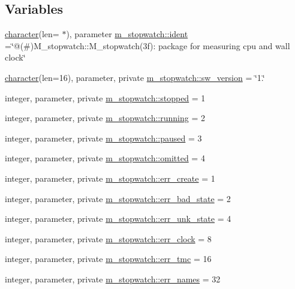 \subsection*{Variables}
\begin{DoxyCompactItemize}
\item 
\hyperlink{option__stopwatch_83_8txt_abd4b21fbbd175834027b5224bfe97e66}{character}(len= $\ast$), parameter \hyperlink{namespacem__stopwatch_a8c8ff2f2cb941e044ea889e7c728c8eb}{m\+\_\+stopwatch\+::ident} =\char`\"{}@(\#)M\+\_\+stopwatch\+::\+M\+\_\+stopwatch(3f)\+: package for measuring cpu and wall clock\char`\"{}
\item 
\hyperlink{option__stopwatch_83_8txt_abd4b21fbbd175834027b5224bfe97e66}{character}(len=16), parameter, private \hyperlink{namespacem__stopwatch_af92219c7ffaec61677d2eeb5004e598c}{m\+\_\+stopwatch\+::sw\+\_\+version} = \char`\"{}1.\char`\"{}
\item 
integer, parameter, private \hyperlink{namespacem__stopwatch_ab81a5f83e4190cfadc0312bfb82042a8}{m\+\_\+stopwatch\+::stopped} = 1
\item 
integer, parameter, private \hyperlink{namespacem__stopwatch_ae9aaee11cd20802153cf7e880f9d3c3e}{m\+\_\+stopwatch\+::running} = 2
\item 
integer, parameter, private \hyperlink{namespacem__stopwatch_af9caaa877a1be74f00ecbab817ffa65c}{m\+\_\+stopwatch\+::paused} = 3
\item 
integer, parameter, private \hyperlink{namespacem__stopwatch_a1add492246e686a4018076984065cee0}{m\+\_\+stopwatch\+::omitted} = 4
\item 
integer, parameter, private \hyperlink{namespacem__stopwatch_a07067757e5248e34a59473135d6ff491}{m\+\_\+stopwatch\+::err\+\_\+create} = 1
\item 
integer, parameter, private \hyperlink{namespacem__stopwatch_ad3dc0decb1422b8e2226d7f6b86a2994}{m\+\_\+stopwatch\+::err\+\_\+bad\+\_\+state} = 2
\item 
integer, parameter, private \hyperlink{namespacem__stopwatch_afc3962f5eafcda98b0ad803dc1b28cb9}{m\+\_\+stopwatch\+::err\+\_\+unk\+\_\+state} = 4
\item 
integer, parameter, private \hyperlink{namespacem__stopwatch_a885cb53744fec08e407298ee970a4a53}{m\+\_\+stopwatch\+::err\+\_\+clock} = 8
\item 
integer, parameter, private \hyperlink{namespacem__stopwatch_acaa885b35cdc454edb5812b95b18883d}{m\+\_\+stopwatch\+::err\+\_\+tmc} = 16
\item 
integer, parameter, private \hyperlink{namespacem__stopwatch_a337c5ec4e2186142778c2799953e3fe3}{m\+\_\+stopwatch\+::err\+\_\+names} = 32

\end{DoxyCompactItemize}
